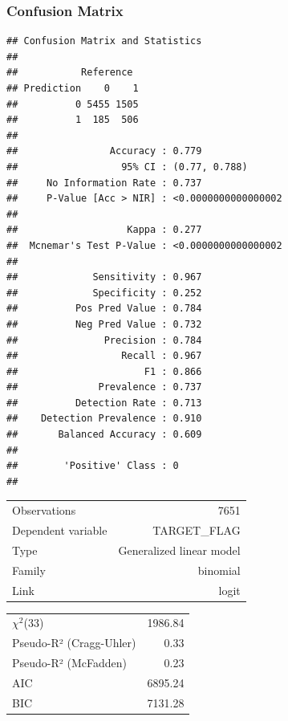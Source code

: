 \documentclass[]{article}
\begin{document}
\subsubsection{Confusion Matrix}\label{confusion-matrix-1}

\begin{verbatim}
## Confusion Matrix and Statistics
## 
##           Reference
## Prediction    0    1
##          0 5455 1505
##          1  185  506
##                                              
##                Accuracy : 0.779              
##                  95% CI : (0.77, 0.788)      
##     No Information Rate : 0.737              
##     P-Value [Acc > NIR] : <0.0000000000000002
##                                              
##                   Kappa : 0.277              
##  Mcnemar's Test P-Value : <0.0000000000000002
##                                              
##             Sensitivity : 0.967              
##             Specificity : 0.252              
##          Pos Pred Value : 0.784              
##          Neg Pred Value : 0.732              
##               Precision : 0.784              
##                  Recall : 0.967              
##                      F1 : 0.866              
##              Prevalence : 0.737              
##          Detection Rate : 0.713              
##    Detection Prevalence : 0.910              
##       Balanced Accuracy : 0.609              
##                                              
##        'Positive' Class : 0                  
## 
\end{verbatim}

\begin{table}[!h]
\centering
\begin{tabular}{lr}
\toprule
\rowcolor{gray!6}  Observations & 7651\\
Dependent variable & TARGET\_FLAG\\
\rowcolor{gray!6}  Type & Generalized linear model\\
Family & binomial\\
\rowcolor{gray!6}  Link & logit\\
\bottomrule
\end{tabular}
\end{table}

\begin{table}[!h]
\centering
\begin{tabular}{lr}
\toprule
\rowcolor{gray!6}  $\chi^2$(33) & 1986.84\\
Pseudo-R² (Cragg-Uhler) & 0.33\\
\rowcolor{gray!6}  Pseudo-R² (McFadden) & 0.23\\
AIC & 6895.24\\
\rowcolor{gray!6}  BIC & 7131.28\\
\bottomrule
\end{tabular}
\end{table}
\end{document}
